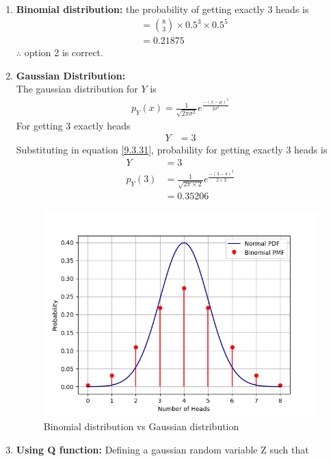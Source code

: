 \documentclass[journal,12pt,onecolumn]{IEEEtran}
\theoremstyle{remark}
\begin{document}
\begin{enumerate}
\item \textbf{Binomial distribution:} 
the probability of getting exactly 3 heads is 
\begin{align}
	&= \binom{8}{3} \times 0.5^3\times 0.5^{5}\\
	&= 0.21875
\end{align}
$\therefore$ option 2 is correct.\\
\item \textbf{Gaussian Distribution:}\\
The gaussian distribution for $Y$ is
\begin{align}
	p_Y(x) = \frac{1}{\sqrt{2\pi\sigma^2}}e^{\frac{-(x-\mu)^2}{2\sigma^2}}\label{9.3.31}
\end{align}
For getting 3 exactly heads
\begin{align}
	Y &= 3
\end{align}
Substituting in equation \eqref{9.3.31}, probability for getting exactly 3 heads is
\begin{align}
	Y &= 3\\
	p_Y(3) &= \frac{1}{\sqrt{2\pi\times2}}e^{\frac{-(3-4)^2}{2\times2}}\\
	&= 0.35206
\end{align}
\begin{figure}[H]
\includegraphics[width=\columnwidth]{./figs/fig.png}
\caption{Binomial distribution vs Gaussian distribution}
	\label{fig58:_9_3_31}
\end{figure}
\item \textbf{Using Q function:}
Defining a gaussian random variable Z such that

\end{enumerate}
\end{document}
